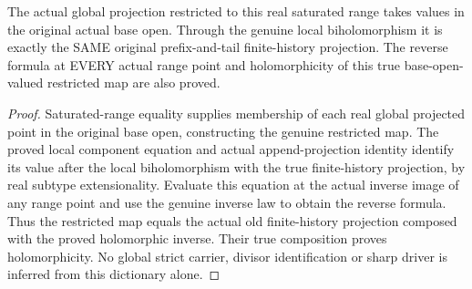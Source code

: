 \begin{theorem}
\label{hir:sharp-actual-endpoint-local-range-projection-dictionary}
\leanok
{}
The actual global projection restricted to this real saturated range takes
values in the original actual base open. Through the genuine local
biholomorphism it is exactly the SAME original prefix-and-tail finite-history
projection. The reverse formula at EVERY actual range point and holomorphicity
of this true base-open-valued restricted map are also proved.
\end{theorem}
\begin{proof}
Saturated-range equality supplies membership of each real global projected
point in the original base open, constructing the genuine restricted map.
The proved local component equation and actual append-projection identity
identify its value after the local biholomorphism with the true finite-history
projection, by real subtype extensionality. Evaluate this equation at the
actual inverse image of any range point and use the genuine inverse law to
obtain the reverse formula. Thus the restricted map equals the actual old
finite-history projection composed with the proved holomorphic inverse.
Their true composition proves holomorphicity. No global strict carrier,
divisor identification or sharp driver is inferred from this dictionary alone.
\end{proof}
